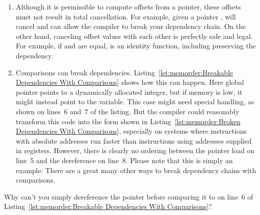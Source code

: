 \begin{enumerate}
\item	Although it is permissible to compute offsets from a
	pointer, these offsets must not result in total cancellation.
	For example, given a  pointer ,
	 will cancel and can allow the compiler
	to break your dependency chain.
	On the other hand, canceling offset values with each other
	is perfectly safe and legal.
	For example, if  and  are equal, 
	is an identity function, including preserving the dependency.
\item	Comparisons can break dependencies.
	Listing~\ref{lst:memorder:Breakable Dependencies With Comparisons}
	shows how this can happen.
	Here global pointer  points to a dynamically allocated
	integer, but if memory is low, it might instead point to
	the  variable.
	This  case might need special handling, as
	shown on lines~6 and~7 of the listing.
	But the compiler could reasonably transform this code into
	the form shown in
	Listing~\ref{lst:memorder:Broken Dependencies With Comparisons},
	especially on systems where instructions with absolute
	addresses run faster than instructions using addresses
	supplied in registers.
	However, there is clearly no ordering between the pointer
	load on line~5 and the dereference on line~8.
	Please note that this is simply an example: There are a great
	many other ways to break dependency chains with comparisons.
\end{enumerate}

\QuickQuiz{}
	Why can't you simply dereference the pointer before comparing it
	to  on line~6 of
	Listing~\ref{lst:memorder:Breakable Dependencies With Comparisons}?
 \QuickQuizEnd

